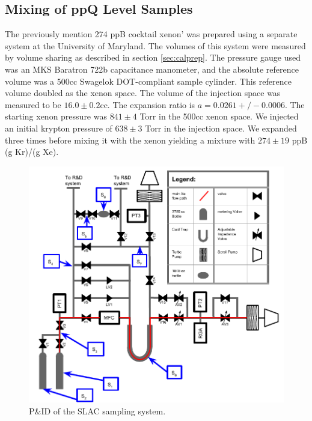 \documentclass[12pt]{article}
\begin{document}
\subsection{Mixing of ppQ Level Samples}
The previously mention 274 ppB cocktail xenon' was prepared using a separate system at the University of Maryland. The volumes of this system were measured by volume sharing as described in section \ref{sec:calprep}. The pressure gauge used was an MKS Baratron 722b capacitance manometer, and the absolute reference volume was a 500cc Swagelok DOT-compliant sample cylinder. This reference volume doubled as the xenon space. The volume of the injection space was measured to be $16.0 \pm 0.2$cc. The expansion ratio is $a=0.0261+/-0.0006$. The starting xenon pressure was $841\pm4$ Torr in the 500cc xenon space. We injected an initial krypton pressure of $638\pm3$ Torr in the injection space. We expanded three times before mixing it with the xenon yielding a mixture with $274\pm19$ ppB (g Kr)/(g Xe).
\begin{figure}[h!]
  \includegraphics[width=\linewidth]{Figures/SLAC_ColdTrap_diagram_wvols.pdf}
  \caption{P\&ID of the SLAC sampling system.}
  \label{fig:SLACpid}
\end{figure}
\end{document}
